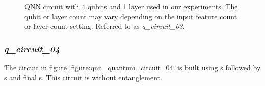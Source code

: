 \begin{figure}[!h]
	\centering
	\caption{QNN circuit with 4 qubits and 1 layer used in our experiments. The qubit or layer count may vary depending on the input feature count or layer count setting. Referred to as \textit{q\_circuit\_03}.}
	\label{figure:qnn_quantum_circuit_03}
\end{figure}

\clearpage

\subsubsection{\textit{q\_circuit\_04}}
\label{subsubsection:qnn_quantum_circuit_04}
The circuit in figure \ref{figure:qnn_quantum_circuit_04} is built using \rxgate s followed by \rygate s and final \rzgate s. This circuit is without entanglement.

